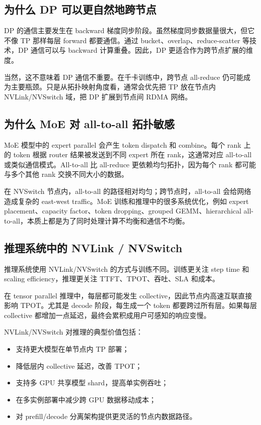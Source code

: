 \subsection{为什么 DP 可以更自然地跨节点}
\label{subsec:dp-cross-node}

DP 的通信主要发生在 backward 梯度同步阶段。虽然梯度同步数据量很大，但它不像 TP 那样每层 forward 都要通信。通过 bucket、overlap、reduce-scatter 等技术，DP 通信可以与 backward 计算重叠。因此，DP 更适合作为跨节点扩展的维度。

当然，这不意味着 DP 通信不重要。在千卡训练中，跨节点 all-reduce 仍可能成为主要瓶颈。只是从拓扑映射角度看，通常会优先把 TP 放在节点内 NVLink/NVSwitch 域，把 DP 扩展到节点间 RDMA 网络。

\subsection{为什么 MoE 对 all-to-all 拓扑敏感}
\label{subsec:moe-alltoall-topology}

MoE 模型中的 expert parallel 会产生 token dispatch 和 combine。每个 rank 上的 token 根据 router 结果被发送到不同 expert 所在 rank，这通常对应 all-to-all 或类似通信模式。All-to-all 比 all-reduce 更依赖均匀拓扑，因为每个 rank 都可能与多个其他 rank 交换不同大小的数据。

在 NVSwitch 节点内，all-to-all 的路径相对均匀；跨节点时，all-to-all 会给网络造成复杂的 east-west traffic。MoE 训练和推理中的很多系统优化，例如 expert placement、capacity factor、token dropping、grouped GEMM、hierarchical all-to-all，本质上都是为了同时处理计算不均衡和通信不均衡。

\subsection{推理系统中的 NVLink / NVSwitch}
\label{subsec:nvlink-serving}

推理系统使用 NVLink/NVSwitch 的方式与训练不同。训练更关注 step time 和 scaling efficiency，推理更关注 TTFT、TPOT、吞吐、SLA 和成本。

在 tensor parallel 推理中，每层都可能发生 collective，因此节点内高速互联直接影响 TPOT。尤其是 decode 阶段，每生成一个 token 都要跨过所有层。如果每层 collective 都增加一点延迟，最终会累积成用户可感知的响应变慢。

NVLink/NVSwitch 对推理的典型价值包括：

\begin{itemize}
  \item 支持更大模型在单节点内 TP 部署；
  \item 降低层内 collective 延迟，改善 TPOT；
  \item 支持多 GPU 共享模型 shard，提高单实例吞吐；
  \item 在多实例部署中减少跨 GPU 数据移动成本；
  \item 对 prefill/decode 分离架构提供更灵活的节点内数据路径。
\end{itemize}

